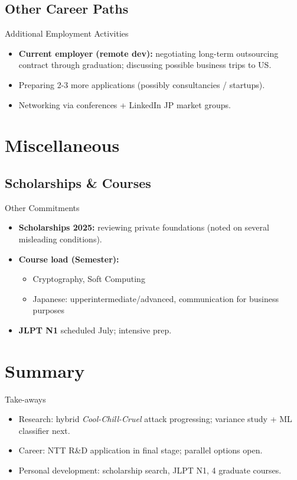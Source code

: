 \documentclass{beamer}
\begin{document}
\subsection{Other Career Paths}
\begin{frame}{Additional Employment Activities}
  \begin{itemize}
    \item \textbf{Current employer (remote dev):} negotiating long-term outsourcing
          contract through graduation; discussing possible business trips to US.
    \item Preparing 2-3 more applications (possibly consultancies / startups).
    \item Networking via conferences + LinkedIn JP market groups.
  \end{itemize}
\end{frame}

\section{Miscellaneous}

\subsection{Scholarships \& Courses}
\begin{frame}{Other Commitments}
  \begin{itemize}
    \item \textbf{Scholarships 2025:} reviewing private foundations  
          (noted on several misleading conditions).
    \item \textbf{Course load (Semester):}
          \begin{itemize}
            \item Cryptography, Soft Computing
            \item Japanese: upperintermediate/advanced, communication for business purposes
          \end{itemize}
    \item \textbf{JLPT N1} scheduled July; intensive prep.
  \end{itemize}
\end{frame}

\section*{Summary}
\begin{frame}{Take-aways}
  \begin{itemize}
    \item Research: hybrid \emph{Cool-Chill-Cruel} attack progressing;
          variance study + ML classifier next.
    \item Career: NTT R\&D application in final stage; parallel options open.
    \item Personal development: scholarship search, JLPT N1, 4 graduate courses.
  \end{itemize}
  \vfill
\end{frame}
\end{document}
